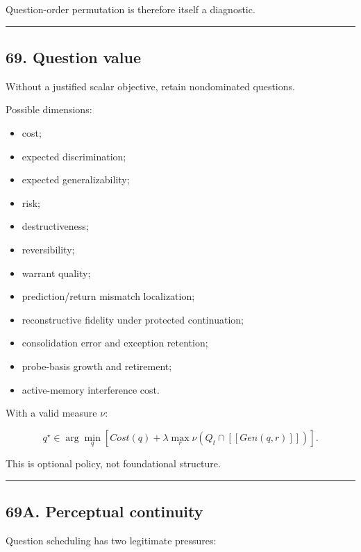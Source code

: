 \documentclass[
]{article}
\providecommand{\tightlist}{%
  \setlength{\itemsep}{0pt}\setlength{\parskip}{0pt}}
\begin{document}
Question-order permutation is therefore itself a diagnostic.

\begin{center}\rule{0.5\linewidth}{0.5pt}\end{center}

\subsection{69. Question value}\label{question-value}

Without a justified scalar objective, retain nondominated questions.

Possible dimensions:

\begin{itemize}
\tightlist
\item
  cost;
\item
  expected discrimination;
\item
  expected generalizability;
\item
  risk;
\item
  destructiveness;
\item
  reversibility;
\item
  warrant quality;
\item
  prediction/return mismatch localization;
\item
  reconstructive fidelity under protected continuation;
\item
  consolidation error and exception retention;
\item
  probe-basis growth and retirement;
\item
  active-memory interference cost.
\end{itemize}

With a valid measure \(\nu\):

\[
q^\star
\in
\arg\min_q
\left[
Cost(q)
+
\lambda
\max_r
\nu
(
Q_t\cap[\![Gen(q,r)]\!]
)
\right].
\]

This is optional policy, not foundational structure.

\begin{center}\rule{0.5\linewidth}{0.5pt}\end{center}


\subsection{69A. Perceptual continuity}\label{perceptual-continuity}

Question scheduling has two legitimate pressures:
\end{document}
